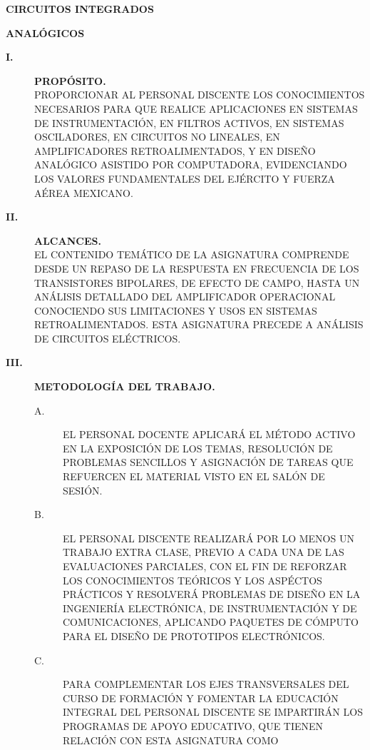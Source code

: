\documentclass{myarticle}
\begin{document}
\begin{center}{\huge{\bf CIRCUITOS INTEGRADOS}}\end{center}
\begin{center}{\huge{\bf ANALÓGICOS}}\end{center}

\begin{description}
\item[{\large{\bf I.}}]{\large{\bf PROPÓSITO.}}\\
PROPORCIONAR AL PERSONAL DISCENTE LOS CONOCIMIENTOS NECESARIOS 
PARA QUE REALICE APLICACIONES EN SISTEMAS DE INSTRUMENTACIÓN, EN FILTROS 
ACTIVOS, EN SISTEMAS OS\-CI\-LA\-DO\-RES, EN CIRCUITOS NO LINEALES, EN 
AMPLIFICADORES RE\-TROA\-LI\-MEN\-TA\-DOS, Y EN DISEÑO ANALÓGICO ASISTIDO 
POR COMPUTADORA, EVIDENCIANDO LOS VALORES FUNDAMENTALES DEL E\-JÉR\-CI\-TO 
Y FUERZA AÉREA MEXICANO.
\item[{\large{\bf II.}}]{\large{\bf ALCANCES.}}\\
EL CONTENIDO TEMÁTICO DE LA ASIGNATURA COMPRENDE DESDE UN REPASO 
DE LA RESPUESTA EN FRECUENCIA DE LOS TRANSISTORES BIPOLARES, DE EFECTO DE 
CAMPO, HASTA UN ANÁLISIS DETALLADO DEL AMPLIFICADOR OPERACIONAL CONOCIENDO 
SUS LIMITACIONES Y USOS EN SISTEMAS RE\-TRO\-A\-LI\-MEN\-TA\-DOS. ESTA 
ASIGNATURA PRECEDE A ANÁLISIS DE CIRCUITOS ELÉCTRICOS.
\item[{\large{\bf III.}}]{\large{\bf  METODOLOGÍA DEL TRABAJO.}}\\
\begin{description}
\item[A.]EL PERSONAL DOCENTE APLICARÁ EL MÉTODO ACTIVO EN LA EXPOSICIÓN 
DE LOS TEMAS, RESOLUCIÓN DE PROBLEMAS SENCILLOS Y ASIGNACIÓN DE TAREAS 
QUE RE\-FUER\-CEN EL MATERIAL VISTO EN EL SALÓN DE SESIÓN.
\item[B.]EL PERSONAL DISCENTE REALIZARÁ POR LO MENOS UN TRABAJO EXTRA CLA\-SE, 
PREVIO A CADA UNA DE LAS EVALUACIONES PARCIALES, CON EL FIN DE REFORZAR 
LOS CONOCIMIENTOS TEÓRICOS Y LOS ASPÉCTOS PRÁCTICOS Y RESOLVERÁ PROBLEMAS 
DE DISEÑO EN LA INGENIERÍA ELECTRÓNICA, DE INSTRUMENTACIÓN Y DE COMUNICACIONES, 
APLICANDO PAQUETES DE CÓMPUTO PARA EL DISEÑO DE PROTOTIPOS ELECTRÓNICOS.
\item[C.]PARA COMPLEMENTAR LOS EJES TRANSVERSALES DEL CUR\-SO DE FORMACIÓN 
Y FOMENTAR LA EDUCACIÓN INTEGRAL DEL PERSONAL DISCENTE SE IMPARTIRÁN LOS 
PROGRAMAS DE APOYO EDUCATIVO, QUE TIENEN RELACIÓN CON ESTA ASIGNATURA COMO 

\end{description}
\end{description}
\end{document}
